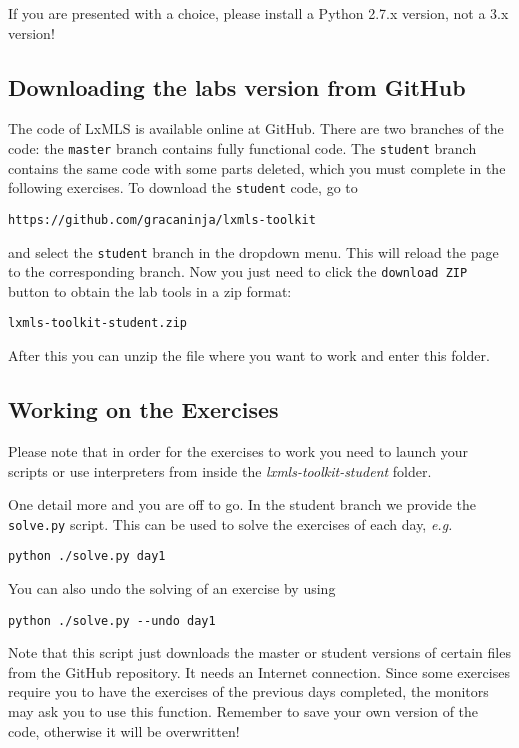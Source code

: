 If you are presented with a choice, please install a Python 2.7.x version, not a 3.x version!

\subsection{Downloading the labs version from GitHub}

The code of LxMLS is available online at GitHub. There are two branches of the code: the \verb+master+ branch contains fully functional code. The \verb+student+ branch contains the same code with some parts deleted, which you must complete in the following exercises. To download the \verb+student+ code, go to

\begin{verbatim}
https://github.com/gracaninja/lxmls-toolkit
\end{verbatim}

\noindent and select the \verb+student+ branch in the dropdown menu. This will reload the page to the corresponding branch. Now you just need to click the \verb+download ZIP+ button to obtain the lab tools in a zip format:

\begin{verbatim}
lxmls-toolkit-student.zip
\end{verbatim}

After this you can unzip the file where you want to work and enter this folder.

\subsection{Working on the Exercises}

Please note that in order for the exercises to work you need to launch your scripts or use interpreters from inside the  \textit{lxmls-toolkit-student} folder.

One detail more and you are off to go. In the student branch we provide the \verb+solve.py+ script. This can be used to solve the exercises of each day, \emph{e.g.}

\begin{verbatim}
python ./solve.py day1
\end{verbatim}

\noindent You can also undo the solving of an exercise by using

\begin{verbatim}
python ./solve.py --undo day1
\end{verbatim}

Note that this script just downloads the master or student versions of certain files from the GitHub repository. It needs an Internet connection. Since some exercises require you to have the exercises of the previous days completed, the monitors may ask you to use this function. Remember to save your own version of the code, otherwise it will be overwritten!

